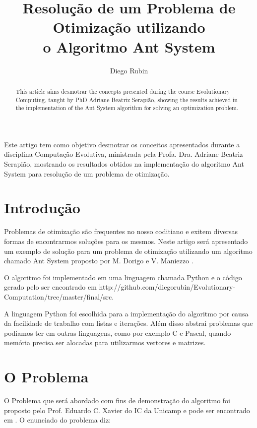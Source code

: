 \documentclass[12pt]{article}
\title{Resolução de um Problema de Otimização utilizando \\o Algoritmo Ant System}
\author{Diego Rubin\inst{1}}
\begin{document}
 

\maketitle

\begin{abstract}
This article aims desmotrar the concepts presented 
during the course Evolutionary Computing, taught 
by PhD Adriane Beatriz Serapião, showing 
the results achieved in the implementation of the 
Ant System algorithm for solving an optimization problem.
\end{abstract}

\begin{resumo} 
Este artigo tem como objetivo desmotrar
os conceitos apresentados durante a 
disciplina Computação Evolutiva, ministrada
pela Profa. Dra. Adriane Beatriz Serapião,
mostrando os resultados obtidos na implementação
do algoritmo Ant System para resolução de um
problema de otimização.
\end{resumo}


\section{Introdução}

Problemas de otimização são frequentes no nosso coditiano e exitem 
diversas formas de encontrarmos soluções para os mesmos. Neste artigo
será apresentado um exemplo de solução para um problema de otimização
utilizando um algoritmo chamado Ant System proposto por M. Dorigo e V. Maniezzo
\cite{AS}.

O algoritmo foi implementado em uma linguagem chamada Python e o 
código gerado pelo ser encontrado em http://github.com/diegorubin/Evolutionary-Computation/tree/master/final/src.

A linguagem Python foi escolhida para a implementação do 
algoritmo por causa da facilidade de trabalho com listas e 
iterações. Além disso abstrai problemas que podiamos ter
em outras linguagens, como por exemplo C e Pascal, quando
memória precisa ser alocadas para utilizarmos vertores
e matrizes.

\section{O Problema} \label{sec:firstpage}

O Problema que será abordado com fins de demonstração do algoritmo
foi proposto pelo Prof. Eduardo C. Xavier do IC da Unicamp e pode
ser encontrado em \cite{xavier}. 
O enunciado do problema diz:
\end{document}
